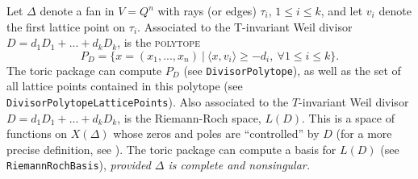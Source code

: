 \documentclass[a4paper,11pt]{report}
\begin{document}
{{{ Let $\Delta$ denote a fan in $V=Q^n$ with rays (or edges) $\tau_i$, $1\leq i\leq k$, and let $v_i$ denote the first lattice point on $\tau_i$. Associated to the T-invariant Weil divisor $D=d_1D_1+...+d_kD_k$, is the \textsc{polytope} 
\[ P_D = \{ x=(x_1,...,x_n)\ |\ \langle x,v_i \rangle \geq -d_i, \ \forall 1 \leq
i \leq k\}. \]
 The \textsf{toric} package can compute $P_D$ (see \texttt{DivisorPolytope}), as well as the set of all lattice points contained in this polytope (see \texttt{DivisorPolytopeLatticePoints}). Also associated to the $T$-invariant Weil divisor $D=d_1D_1+...+d_kD_k$, is the Riemann-Roch space, $L(D)$. This is a space of functions on $X(\Delta)$ whose zeros and poles are ``controlled'' by $D$ (for a more precise definition, see \cite{F93}). The \textsf{toric} package can compute a basis for $L(D)$ (see \texttt{RiemannRochBasis}), \emph{ provided $\Delta$ is complete and nonsingular.}  }

 }

 }

 
\end{document}
